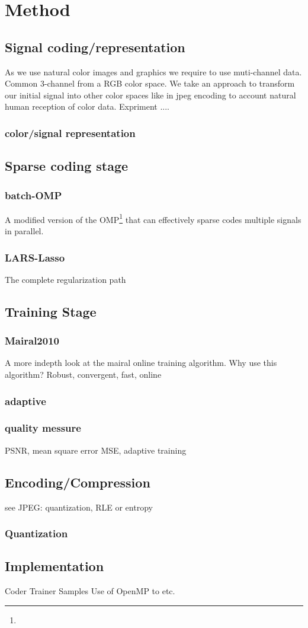 \chapter{Method}


\section{Signal coding/representation}
As we use natural color images and graphics we require to use muti-channel data. Common 3-channel from a RGB color space.
We take an approach to transform our initial signal into other color spaces like in jpeg encoding to account natural human reception of
color data. 
Expriment ....
\subsection{color/signal representation}

\section{Sparse coding stage}
\subsection{batch-OMP}
A modified version of the OMP\footnote{} that can effectively sparse codes multiple signals in parallel.

\subsection{LARS-Lasso}
The complete regularization path

\section{Training Stage}
\subsection{Mairal2010}
A more indepth look at the mairal online training algorithm. 
Why use this algorithm? Robust, convergent, fast, online

\subsection{adaptive}

\subsection{quality messure}
PSNR, mean square error MSE, adaptive training 

\section{Encoding/Compression}
see JPEG: quantization, RLE or entropy

\subsection{Quantization}


\section{Implementation}


Coder
Trainer
Samples
Use of OpenMP to 
etc.


